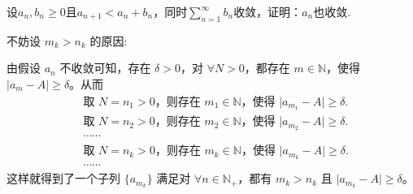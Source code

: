 \documentclass[../../main.tex]{subfiles}
\begin{document}
\begin{example}
设\(a_n,b_n\geqslant 0\)且\(a_{n + 1}<a_n + b_n\)，同时\(\sum_{n = 1}^{\infty}b_n\)收敛，证明：\(a_n\)也收敛.
\end{example}
\begin{remark}
\hypertarget{example4.58不妨设的原因}{不妨设 \(m_k > n_k\) 的原因:}由假设 \(a_n\) 不收敛可知，存在 \(\delta > 0\)，对 \(\forall N > 0\)，都存在 \(m \in \mathbb{N}\)，使得 \(\vert a_m - A \vert \geqslant \delta\)。从而
\begin{align*}
&\text{取 }N = n_1 > 0\text{，则存在 }m_1 \in \mathbb{N}\text{，使得 }\vert a_{m_1} - A \vert \geqslant \delta.\\
&\text{取 }N = n_2 > 0\text{，则存在 }m_2 \in \mathbb{N}\text{，使得 }\vert a_{m_2} - A \vert \geqslant \delta.\\
&\cdots\cdots\\
&\text{取 }N = n_k > 0\text{，则存在 }m_k \in \mathbb{N}\text{，使得 }\vert a_{m_k} - A \vert \geqslant \delta.\\
&\cdots\cdots
\end{align*}
这样就得到了一个子列 \(\{ a_{m_k} \}\) 满足对 \(\forall n \in \mathbb{N}_+\)，都有 \(m_k > n_k\) 且 \(\vert a_{m_k} - A \vert \geqslant \delta\)。
\end{remark}
\end{document}
